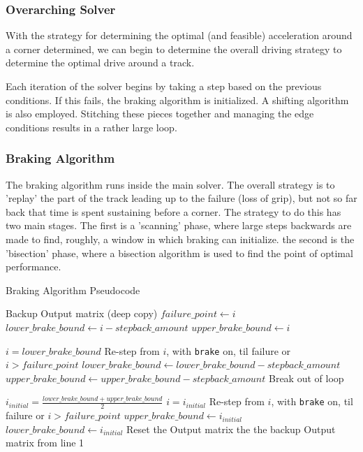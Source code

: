 \documentclass{article}
\begin{document}
\subsubsection{Overarching Solver}

With the strategy for determining the optimal (and feasible) acceleration around a corner determined, we can begin to determine the overall driving strategy to determine the optimal drive around a track.

Each iteration of the solver begins by taking a step based on the previous conditions. If this fails, the braking algorithm is initialized. A shifting algorithm is also employed. Stitching these pieces together and managing the edge conditions results in a rather large loop.

\subsubsection{Braking Algorithm}
The braking algorithm runs inside the main solver. The overall strategy is to 'replay' the part of the track leading up to the failure (loss of grip), but not so far back that time is spent sustaining before a corner. The strategy to do this has two main stages. The first is a 'scanning' phase, where large steps backwards are made to find, roughly, a window in which braking can initialize. the second is the 'bisection' phase, where a bisection algorithm is used to find the point of optimal performance.

\begin{algorithm}[H]
\caption{Braking Algorithm Pseudocode}
\begin{algorithmic}[1]
	\State Backup Output matrix (deep copy)
	\State $failure\_point \gets i$
	\State $lower\_brake\_bound \gets i-stepback\_amount$
	\State $upper\_brake\_bound \gets i$
	
		\State $i = lower\_brake\_bound$
		\State Re-step from $i$, with \texttt{brake} on, til failure or $i > failure\_point$
			\State $lower\_brake\_bound \gets lower\_brake\_bound - stepback\_amount$
			\State $upper\_brake\_bound \gets upper\_brake\_bound - stepback\_amount$
		\Else
			\State Break out of loop
		\EndIf
	\EndWhile
	
		\State $i_{initial} = \frac{lower\_brake\_bound + upper\_brake\_bound}{2}$
		\State $i = i_{initial}$
		\State Re-step from $i$, with \texttt{brake} on, til failure or $i > failure\_point$
			\State $upper\_brake\_bound \gets i_{initial}$
		\Else
			\State $lower\_brake\_bound \gets i_{initial}$
		\EndIf
		\State Reset the Output matrix the the backup Output matrix from line 1
	\EndWhile
	
\end{algorithmic}
\end{algorithm}
\end{document}

